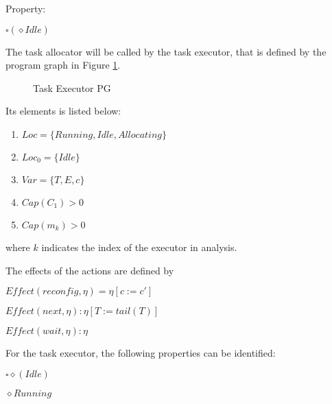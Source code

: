 Property: 

\begin{center}
$ \square (\diamond Idle) $
\end{center}

The task allocator will be called by the task executor, that is defined by the program graph in Figure \ref{executor}.

\begin{figure}[h]
\centering

\label{executor}
\caption{Task Executor PG}
\end{figure}

Its elements is listed below:

\begin{enumerate}

    \item $Loc=\{Running, Idle, Allocating \}$
    
    \item $Loc_0=\{Idle\}$
    
    \item $Var=\{T, E, c\} $
    
    \item $Cap(C_1)>0 $
    
    \item $Cap(m_k)>0 $
    
\end{enumerate}

where $k$ indicates the index of the executor in analysis.

The effects of the actions are defined by

\qquad $Effect(reconfig, \eta)= \eta[c:=c']$
    
\qquad $Effect(next, \eta): \eta[T:=tail(T)]$

\qquad $Effect(wait, \eta): \eta$

For the task executor, the following properties can be identified:

\qquad $\square \diamond (Idle)$

\qquad $\diamond Running$